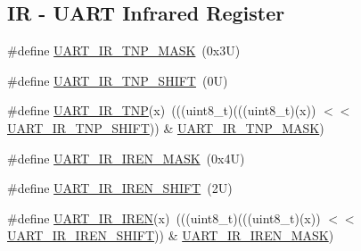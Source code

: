 \subsection*{IR -\/ U\+A\+RT Infrared Register}
\begin{DoxyCompactItemize}
\item 
\#define \mbox{\hyperlink{group___u_a_r_t___register___masks_ga635e77629e602b47032f8d35dda0f442}{U\+A\+R\+T\+\_\+\+I\+R\+\_\+\+T\+N\+P\+\_\+\+M\+A\+SK}}~(0x3\+U)
\item 
\#define \mbox{\hyperlink{group___u_a_r_t___register___masks_gafc08f087483347c37c3051f6c86d2beb}{U\+A\+R\+T\+\_\+\+I\+R\+\_\+\+T\+N\+P\+\_\+\+S\+H\+I\+FT}}~(0\+U)
\item 
\#define \mbox{\hyperlink{group___u_a_r_t___register___masks_ga5c51f9fcc539b3d1c55ede0ca356e506}{U\+A\+R\+T\+\_\+\+I\+R\+\_\+\+T\+NP}}(x)~(((uint8\+\_\+t)(((uint8\+\_\+t)(x)) $<$$<$ \mbox{\hyperlink{group___u_a_r_t___register___masks_gafc08f087483347c37c3051f6c86d2beb}{U\+A\+R\+T\+\_\+\+I\+R\+\_\+\+T\+N\+P\+\_\+\+S\+H\+I\+FT}})) \& \mbox{\hyperlink{group___u_a_r_t___register___masks_ga635e77629e602b47032f8d35dda0f442}{U\+A\+R\+T\+\_\+\+I\+R\+\_\+\+T\+N\+P\+\_\+\+M\+A\+SK}})
\item 
\#define \mbox{\hyperlink{group___u_a_r_t___register___masks_gafb25f2545b505763066c9f30ff7447f0}{U\+A\+R\+T\+\_\+\+I\+R\+\_\+\+I\+R\+E\+N\+\_\+\+M\+A\+SK}}~(0x4\+U)
\item 
\#define \mbox{\hyperlink{group___u_a_r_t___register___masks_ga674f392636537dcd6dd92309bead60b9}{U\+A\+R\+T\+\_\+\+I\+R\+\_\+\+I\+R\+E\+N\+\_\+\+S\+H\+I\+FT}}~(2\+U)
\item 
\#define \mbox{\hyperlink{group___u_a_r_t___register___masks_gac149f7dde9651c4a2839d2c985d3d0b9}{U\+A\+R\+T\+\_\+\+I\+R\+\_\+\+I\+R\+EN}}(x)~(((uint8\+\_\+t)(((uint8\+\_\+t)(x)) $<$$<$ \mbox{\hyperlink{group___u_a_r_t___register___masks_ga674f392636537dcd6dd92309bead60b9}{U\+A\+R\+T\+\_\+\+I\+R\+\_\+\+I\+R\+E\+N\+\_\+\+S\+H\+I\+FT}})) \& \mbox{\hyperlink{group___u_a_r_t___register___masks_gafb25f2545b505763066c9f30ff7447f0}{U\+A\+R\+T\+\_\+\+I\+R\+\_\+\+I\+R\+E\+N\+\_\+\+M\+A\+SK}})
\end{DoxyCompactItemize}
